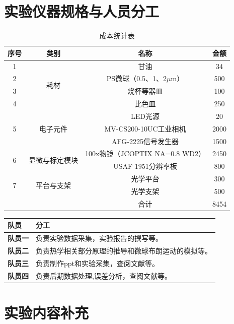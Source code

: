 \documentclass[a4paper]{report} %
\begin{document}
\section{实验仪器规格与人员分工}
\begin{table}[H]
\centering
\caption{成本统计表}
\begin{tabular}{c c c c}
\toprule
序号 & 类别 & 名称 & 金额 \\
\midrule
1 & \multirow{4}{*}{耗材} & 甘油 & 34 \\
2 &                     & PS微球（0.5、1、2$\mu$m） & 500 \\
3 &                     & 烧杯等器皿 & 100 \\
4 &                     & 比色皿 & 250 \\
\midrule
\multirow{3}{*}{5} & \multirow{3}{*}{电子元件} 
 & LED光源 & 20 \\
 & & MV-CS200-10UC工业相机 & 2000 \\
 & & AFG-2225信号发生器 & 1500 \\
\midrule
\multirow{2}{*}{6} & \multirow{2}{*}{显微与标定模块} 
 & 100x物镜（JCOPTIX NA=0.8 WD2） & 2450 \\
 & & USAF 1951分辨率板 & 800 \\
\midrule
\multirow{2}{*}{7} & \multirow{2}{*}{平台与支架} 
 & 光学平台 & 300 \\
 & & 光学支架 & 500 \\
\midrule
 & & 合计 & 8454 \\
\bottomrule
\end{tabular}
\end{table}

\renewcommand{\arraystretch}{1.3} %

\begin{tabularx}{\textwidth}{>{\bfseries}l X}
\toprule
队员 & 分工 \\
\midrule
队员一 & 负责实验数据采集，实验报告的撰写等。 \\
队员二 & 负责热学相关部分原理的推导和微球布朗运动的模拟等。 \\
队员三 & 负责制作ppt和实验采集，查阅文献等。 \\
队员四 & 负责后期数据处理,误差分析，查阅文献等。 \\
\bottomrule
\end{tabularx}

\section{实验内容补充}
\end{document}
